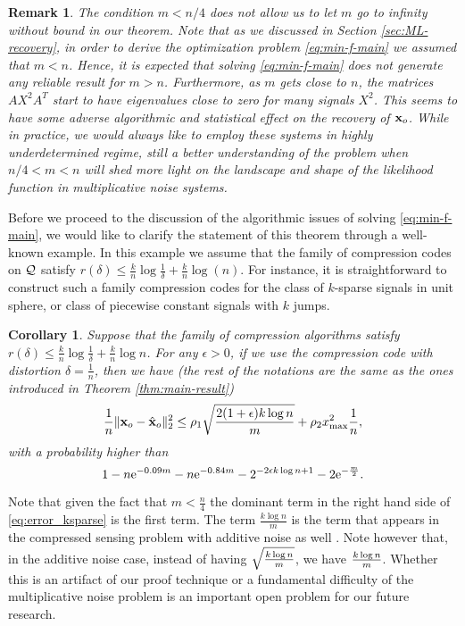 \documentclass[onecolumn]{IEEEtran}
\newcommand{\xvh}{\hat{\xv}}
\newtheorem{corollary}{Corollary}
\newtheorem{remark}{Remark}
\begin{document}
\begin{remark}
 The condition $m<n/4$ does not allow us to let $m$ go to infinity without bound in our theorem. Note that as we discussed in Section \ref{sec:ML-recovery}, in order to derive the optimization problem \eqref{eq:min-f-main} we assumed that $m<n$. Hence, it is expected that solving  \eqref{eq:min-f-main} does not generate any reliable result for $m >n$. Furthermore, as $m$ gets close to $n$, the matrices $AX^2A^T$ start to have eigenvalues close to zero for many signals $X^2$. This seems to have some adverse algorithmic and statistical effect on the recovery of ${\bf x}_o$. While in practice, we would always like to employ these systems in highly underdetermined regime, still a better understanding of the problem when $n/4<m<n$ will shed more light on the landscape and shape of the likelihood function in multiplicative noise systems. 
\end{remark}

Before we proceed to the discussion of the algorithmic issues of solving \eqref{eq:min-f-main}, we would like to clarify the statement of this theorem through a well-known example. In this example we assume that the family of compression codes on $\mathcal{Q}$ satisfy $r(\delta) \leq \frac{k}{n} \log \frac{1}{\delta} + \frac{k}{n} \log (n)$. For instance, it is straightforward to construct such a family compression codes for the class of $k$-sparse signals in unit sphere, or class of piecewise constant signals with $k$ jumps.   

\begin{corollary}
Suppose that the family of compression algorithms satisfy $r(\delta) \leq \frac{k}{n} \log \frac{1}{\delta} + \frac{k}{n} \log n$. For any $\epsilon>0$, if we use the compression code with distortion $\delta= \frac{1}{n}$, then we have (the rest of the notations are the same as the ones introduced in Theorem \ref{thm:main-result})
\begin{align}\label{eq:error_ksparse}
 {1\over n} \| \xv_o- \xvh_o\|_2^2 \leq \rho_1 \sqrt{2(1+\epsilon)k \log n   \over m} + \rho_2 x_{\max}^2\frac{1}{n},
\end{align}
with a probability higher than
\[
1-n{\rm e}^{-0.09m}-n{\rm e}^{-0.84m}-2^{-2\epsilon k \log n +1}-2{\rm e}^{-{m\over 2}}.
\]
\end{corollary}
Note that given the fact that $m< \frac{n}{4}$ the dominant term in the right hand side of \eqref{eq:error_ksparse} is the first term. The term $\frac{k \log n}{m}$ is the term that appears in the compressed sensing problem with additive noise as well \cite{bickel2009simultaneous}.  Note however that, in the additive noise case, instead of having $\sqrt{k \log n   \over m} $, we have ${k \log n   \over m}$. Whether this is an artifact of our proof technique or a fundamental difficulty of the multiplicative noise problem is an important open problem for our future research.   
\end{document}
